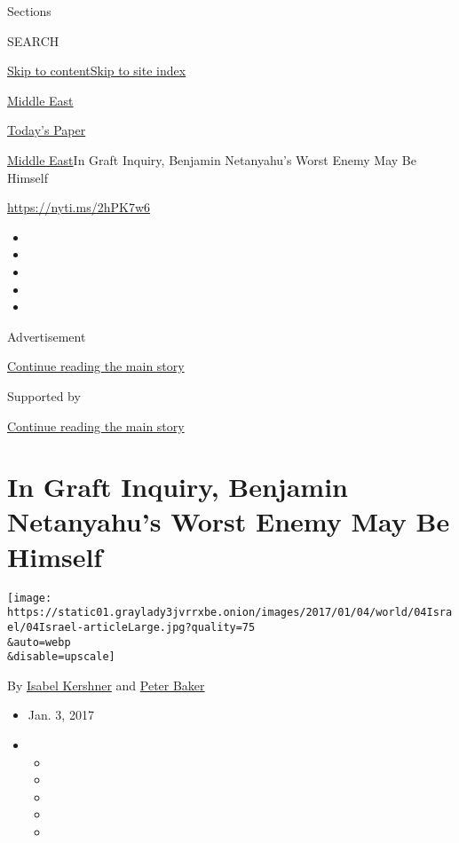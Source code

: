 Sections

SEARCH

\protect\hyperlink{site-content}{Skip to
content}\protect\hyperlink{site-index}{Skip to site index}

\href{https://www.nytimes3xbfgragh.onion/section/world/middleeast}{Middle
East}

\href{https://myaccount.nytimes3xbfgragh.onion/auth/login?response_type=cookie\&client_id=vi}{}

\href{https://www.nytimes3xbfgragh.onion/section/todayspaper}{Today's
Paper}

\href{/section/world/middleeast}{Middle East}\textbar{}In Graft Inquiry,
Benjamin Netanyahu's Worst Enemy May Be Himself

\url{https://nyti.ms/2hPK7w6}

\begin{itemize}
\item
\item
\item
\item
\item
\end{itemize}

Advertisement

\protect\hyperlink{after-top}{Continue reading the main story}

Supported by

\protect\hyperlink{after-sponsor}{Continue reading the main story}

\hypertarget{in-graft-inquiry-benjamin-netanyahus-worst-enemy-may-be-himself}{%
\section{In Graft Inquiry, Benjamin Netanyahu's Worst Enemy May Be
Himself}\label{in-graft-inquiry-benjamin-netanyahus-worst-enemy-may-be-himself}}

\texttt{[image: https://static01.graylady3jvrrxbe.onion/images/2017/01/04/world/04Israel/04Israel-articleLarge.jpg?quality=75\\\&auto=webp\\\&disable=upscale]}

By \href{https://www.nytimes3xbfgragh.onion/by/isabel-kershner}{Isabel
Kershner} and
\href{http://www.nytimes3xbfgragh.onion/by/peter-baker}{Peter Baker}

\begin{itemize}
\item
  Jan. 3, 2017
\item
  \begin{itemize}
  \item
  \item
  \item
  \item
  \item
  \end{itemize}
\end{itemize}

